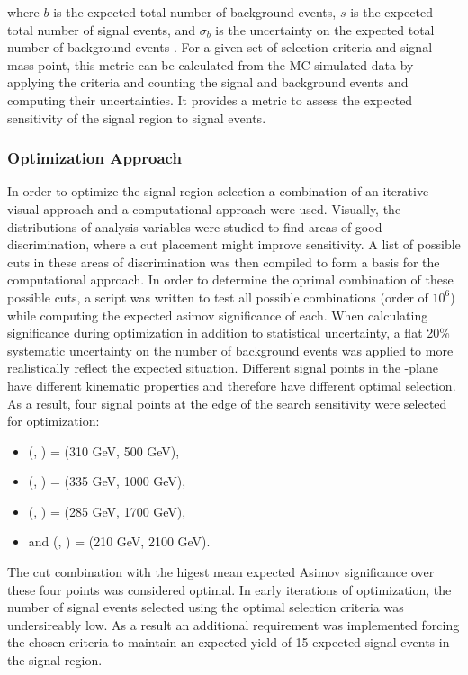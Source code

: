 where $b$ is the expected total number of background events, $s$ is the expected total number of signal events, and $\sigma_b$ is the uncertainty on the expected total number of background events \cite{Asimov}. For a given set of selection criteria and signal mass point, this metric can be calculated from the MC simulated data by applying the criteria and counting the signal and background events and computing their uncertainties. It provides a metric to assess the expected sensitivity of the signal region to signal events.

\subsubsection{Optimization Approach}
In order to optimize the signal region selection a combination of an iterative visual approach and a computational approach were used. Visually, the distributions of analysis variables were studied to find areas of good discrimination, where a cut placement might improve sensitivity. A list of possible cuts in these areas of discrimination was then compiled to form a basis for the computational approach. In order to determine the oprimal combination of these possible cuts, a script was written to test all possible combinations (order of $10^6$) while computing the expected asimov significance of each. When calculating significance during optimization in addition to statistical uncertainty, a flat 20\% systematic uncertainty on the number of background events was applied to more realistically reflect the expected situation. Different signal points in the \ms-\mZp plane have different kinematic properties and therefore have different optimal selection. As a result, four signal points at the edge of the search sensitivity were selected for optimization:

\begin{itemize}
  \item (\ms, \mZp) = (310 GeV, 500 GeV),
  \item (\ms, \mZp) = (335 GeV, 1000 GeV),
  \item (\ms, \mZp) = (285 GeV, 1700 GeV),
  \item and (\ms, \mZp) = (210 GeV, 2100 GeV).
\end{itemize}

The cut combination with the higest mean expected Asimov significance over these four points was considered optimal. In early iterations of optimization, the number of signal events selected using the optimal selection criteria was undersireably low. As a result an additional requirement was implemented forcing the chosen criteria to maintain an expected yield of 15 expected signal events in the \merged signal region.

